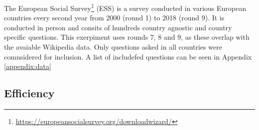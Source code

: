 The European Social Survey\footnote{\url{https://europeansocialsurvey.org/downloadwizard/}} (ESS) is a survey conducted in various European countries every second year from 2000 (round 1) to 2018 (round 9). It is conducted in person and consits of hundreds country agnostic and country specific questions. This exerpiment uses rounds 7, 8 and 9, as these overlap with the avaiable Wikipedia data.
Only questions asked in all countries were comnsidered for inclusion. A list of includefed questions can be seen in Appendix  \ref{appendix:data}


\subsection*{Efficiency}


